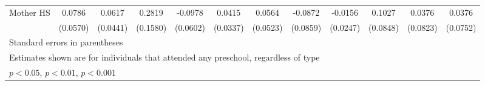 \begin{table}[htbp]
\begin{tabular}{l*{11}{c}}
\addlinespace
Mother HS   &      0.0786         &      0.0617         &      0.2819         &     -0.0978         &      0.0415         &      0.0564         &     -0.0872         &     -0.0156         &      0.1027         &      0.0376         &      0.0376         \\
            &    (0.0570)         &    (0.0441)         &    (0.1580)         &    (0.0602)         &    (0.0337)         &    (0.0523)         &    (0.0859)         &    (0.0247)         &    (0.0848)         &    (0.0823)         &    (0.0752)         \\
\bottomrule
\multicolumn{12}{l}{\footnotesize Standard errors in parentheses}\\
\multicolumn{12}{l}{\footnotesize Estimates shown are for individuals that attended any preschool, regardless of type}\\
\multicolumn{12}{l}{\footnotesize \sym{*} \(p<0.05\), \sym{**} \(p<0.01\), \sym{***} \(p<0.001\)}\\
\end{tabular}
\end{table}
